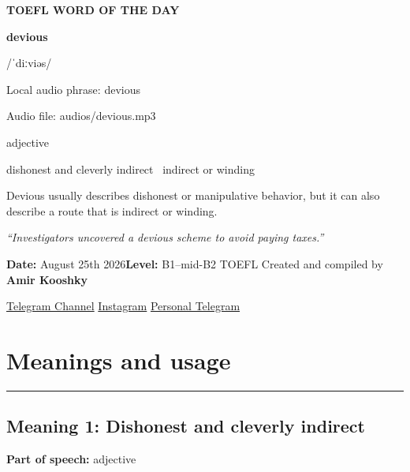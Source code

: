 \documentclass[11pt]{article}
\newcommand{\sectionrule}{\par\vspace{-0.5em}\noindent\textcolor{Accent}{\rule{\linewidth}{0.6pt}}\par}
\begin{document}
\begin{center}
{\sffamily\bfseries\color{Accent} TOEFL WORD OF THE DAY\par}
\vspace{8mm}
{\fontsize{42}{48}\selectfont\bfseries devious\par}
\vspace{2mm}
{\Large\sffamily\color{Accent} /ˈdiːviəs/\par}
\vspace{2mm}
{\small\sffamily Local audio phrase: devious\par}
{\small\sffamily Audio file: audios/devious.mp3\par}
\vspace{2mm}
{\large\sffamily\color{Muted} adjective\par}
\vspace{5mm}
{\sffamily dishonest and cleverly indirect \textbullet\ indirect or winding\par}
\vspace{6mm}
{\large Devious usually describes dishonest or manipulative behavior, but it can also describe a route that is indirect or winding.\par}
\vspace{6mm}
\begin{minipage}{0.84\textwidth}
\itshape “Investigators uncovered a devious scheme to avoid paying taxes.”
\end{minipage}\par
\vspace{10mm}
\textbf{Date:} August 25th 2026\quad\textbullet\quad \textbf{Level:} B1--mid-B2 TOEFL
\vfill
Created and compiled by \textbf{Amir Kooshky}\par
\vspace{2mm}
\href{https://t.me/KooshkyTOEFL}{Telegram Channel}\quad\textbullet\quad
\href{https://www.instagram.com/kooshkytoefl}{Instagram}\quad\textbullet\quad
\href{https://t.me/KooshkyTOEFL\_pv}{Personal Telegram}
\end{center}
\newpage
\tableofcontents
\newpage

\section{Meanings and usage}
\sectionrule
\subsection{Meaning 1: Dishonest and cleverly indirect}
\textbf{Part of speech:} adjective
\end{document}
